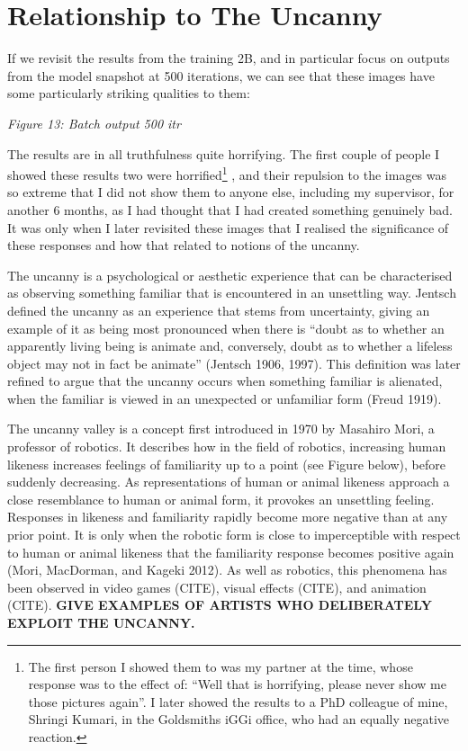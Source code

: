 \section{Relationship to The Uncanny}

If we revisit the results from the training 2B, and in particular focus on outputs from the model snapshot at 500 iterations, we can see that these images have some particularly striking qualities to them:

\textit{Figure 13: Batch output 500 itr}

The results are in all truthfulness quite horrifying. 
The first couple of people I showed these results two were horrified\footnote{
    The first person I showed them to was my partner at the time, whose response was to the effect of: ``Well that is horrifying, please never show me those pictures again''. I later showed the results to a PhD colleague of mine, Shringi Kumari, in the Goldsmiths iGGi office, who had an equally negative reaction.}
, and their repulsion to the images was so extreme that I did not show them to anyone else, including my supervisor, for another 6 months, as I had thought that I had created something genuinely bad. 
It was only when I later revisited these images that I realised the significance of these responses and how that related to notions of the uncanny. 

The uncanny is a psychological or aesthetic experience that can be characterised as observing something familiar that is encountered in an unsettling way. 
Jentsch defined the uncanny as an experience that stems from uncertainty, giving an example of it as being most pronounced when there is “doubt as to whether an apparently living being is animate and, conversely, doubt as to whether a lifeless object may not in fact be animate” (Jentsch 1906, 1997). 
This definition was later refined to argue that the uncanny occurs when something familiar is alienated, when the familiar is viewed in an unexpected or unfamiliar form (Freud 1919).

The uncanny valley is a concept first introduced in 1970 by Masahiro Mori, a professor of robotics. 
It describes how in the field of robotics, increasing human likeness increases feelings of familiarity up to a point (see Figure below), before suddenly decreasing. 
As representations of human or animal likeness approach a close resemblance to human or animal form, it provokes an unsettling feeling. 
Responses in likeness and familiarity rapidly become more negative than at any prior point. 
It is only when the robotic form is close to imperceptible with respect to human or animal likeness that the familiarity response becomes positive again (Mori, MacDorman, and Kageki 2012). 
As well as robotics, this phenomena has been observed in video games (CITE), visual effects (CITE), and animation (CITE). 
\textbf{GIVE EXAMPLES OF ARTISTS WHO DELIBERATELY EXPLOIT THE UNCANNY.}

